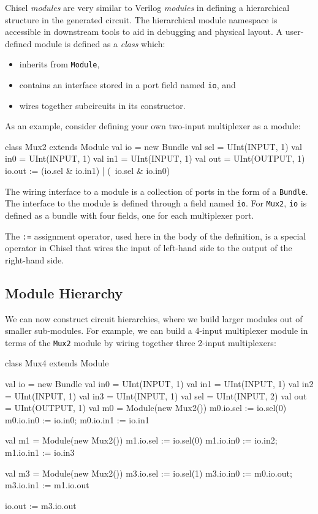 \documentclass[twocolumn,10pt]{article}
\def\code#1{{\tt #1}}
\begin{document}
Chisel {\em modules} are very similar to Verilog {\em modules} in
defining a hierarchical structure in the generated circuit.
The hierarchical module namespace is accessible in downstream tools
to aid in debugging and physical layout.  A user-defined module is
defined as a {\em class} which:
\begin{itemize}
\item inherits from \code{Module},
\item contains an interface stored in a port field named \code{io}, and
\item wires together subcircuits in its constructor.
\end{itemize}
As an example, consider defining your own two-input multiplexer as a
module:
\begin{scala}
class Mux2 extends Module {
  val io = new Bundle{
    val sel = UInt(INPUT, 1)
    val in0 = UInt(INPUT, 1)
    val in1 = UInt(INPUT, 1)
    val out = UInt(OUTPUT, 1)
  }
  io.out := (io.sel & io.in1) | (~io.sel & io.in0)
}
\end{scala}

\noindent
The wiring interface to a module is a collection of ports in the
form of a \code{Bundle}.  The interface to the module is defined
through a field named \code{io}.  For \code{Mux2}, \code{io} is
defined as a bundle with four fields, one for each multiplexer port.

The \code{:=} assignment operator, used here in the body of the
definition, is a special operator in Chisel that wires the input of
left-hand side to the output of the right-hand side.

\subsection{Module Hierarchy}

We can now construct circuit hierarchies, where we build larger modules out
of smaller sub-modules.  For example, we can build a 4-input
multiplexer module in terms of the \code{Mux2} module by wiring
together three 2-input multiplexers:

\begin{scala}
class Mux4 extends Module {
  val io = new Bundle {
    val in0 = UInt(INPUT, 1)
    val in1 = UInt(INPUT, 1)
    val in2 = UInt(INPUT, 1)
    val in3 = UInt(INPUT, 1)
    val sel = UInt(INPUT, 2)
    val out = UInt(OUTPUT, 1)
  }
  val m0 = Module(new Mux2())
  m0.io.sel := io.sel(0) 
  m0.io.in0 := io.in0; m0.io.in1 := io.in1

  val m1 = Module(new Mux2())
  m1.io.sel := io.sel(0) 
  m1.io.in0 := io.in2; m1.io.in1 := io.in3

  val m3 = Module(new Mux2())
  m3.io.sel := io.sel(1) 
  m3.io.in0 := m0.io.out; m3.io.in1 := m1.io.out

  io.out := m3.io.out
}
\end{scala}
\end{document}
